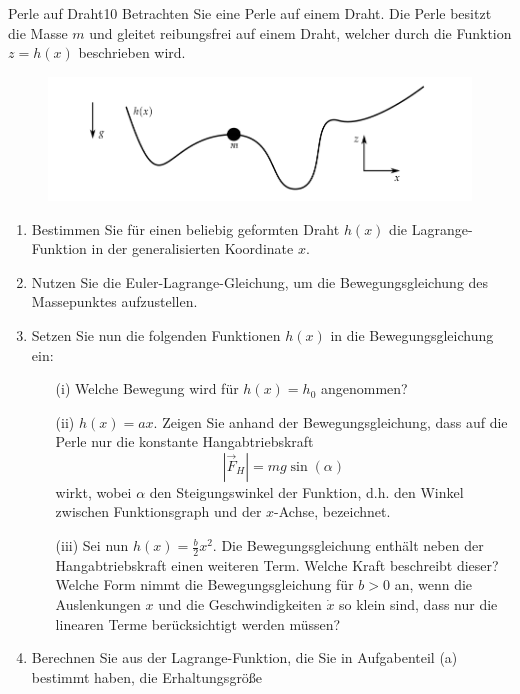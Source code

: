 \begin{exercise}{Perle auf Draht}{10}
  Betrachten Sie eine Perle auf einem Draht. Die Perle besitzt die Masse $m$
  und gleitet reibungsfrei auf einem Draht, welcher durch die Funktion $z = h(x)$
  beschrieben wird.

  \begin{figure}[h]
    \centering
    \includegraphics[width=\textwidth]{Blatt_06_PerleaufDraht.png}
    \label{fig:Höhenprofil}
  \end{figure}

    \begin{enumerate}
        \item Bestimmen Sie für einen beliebig geformten Draht $h(x)$ die Lagrange-Funktion
        in der generalisierten Koordinate $x$.
        \item Nutzen Sie die Euler-Lagrange-Gleichung, um die Bewegungsgleichung
        des Massepunktes aufzustellen.
        \item Setzen Sie nun die folgenden Funktionen $h(x)$ in die Bewegungsgleichung
        ein:
        \begin{itemize}
          \item[(i)] Welche Bewegung wird für $h(x) = h_0$ angenommen?
          \item[(ii)] $h(x) = ax$. Zeigen Sie anhand der Bewegungsgleichung, dass
          auf die Perle nur die konstante Hangabtriebskraft
          \begin{equation}
            \label{eqn:Hangabtrieb}
            \left|\vec{F}_{H}\right| = mg\sin\left(\alpha\right)
          \end{equation}
          wirkt, wobei $\alpha$ den Steigungswinkel der Funktion, d.h. den Winkel
          zwischen Funktionsgraph und der $x$-Achse, bezeichnet.
          \item[(iii)] Sei nun $h(x) = \frac{b}{2}x^2$. Die Bewegungsgleichung enthält
           neben der Hangabtriebskraft einen weiteren Term. Welche Kraft beschreibt
           dieser?\\
           
           Welche Form nimmt die Bewegungsgleichung für $b > 0$ an, wenn die
           Auslenkungen $x$
           und die Geschwindigkeiten $\dot{x}$ so klein sind, dass nur die linearen Terme
           berücksichtigt werden müssen?\\
         \end{itemize}
           \item Berechnen Sie aus der Lagrange-Funktion, die Sie in Aufgabenteil (a)
           bestimmt haben, die Erhaltungsgrö\ss e


\end{enumerate}
\end{exercise}
